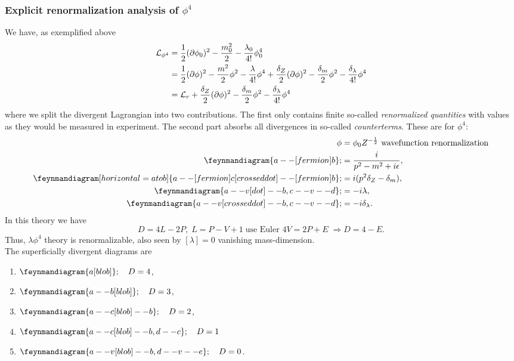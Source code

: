 \subsubsection{Explicit renormalization analysis of $\phi^4$}
\label{subsubsec:phifourrenormalization}
We have, as exemplified above
\begin{align*}
	\mathcal{L}_{\phi^4} &= \frac{1}{2} (\partial \phi_0)^2-\frac{m^2_0}{2} -\frac{\lambda_0}{4!} \phi^4_0 \\
	&= \frac{1}{2} (\partial \phi)^2-\frac{m^2}{2}\phi^2-\frac{\lambda}{4!}\phi^4 + \frac{\delta_Z}{2} (\partial \phi)^2 -\frac{\delta_m}{2} \phi^2 -\frac{\delta_\lambda}{4!} \phi^4\\
	&=\mathcal{L}_r +  \frac{\delta_Z}{2} (\partial \phi)^2 -\frac{\delta_m}{2} \phi^2 -\frac{\delta_\lambda}{4!} \phi^4 
\end{align*}
where we split the divergent Lagrangian into two contributions. The first only contains finite so-called \emph{renormalized quantities} with values as they would be measured in experiment. The second part absorbs all divergences in so-called \emph{counterterms}. These are for $\phi^4$:
\begin{align*}
	\phi &= \phi_0 Z^{-\half} \text{ wavefunction renormalization}\\
	\feynmandiagram{a--[fermion]b}; &= \frac{i}{p^2-m^2+i \epsilon},\\
	\feynmandiagram[horizontal=a to b]{a--[fermion] c [crossed dot] --[fermion] b};&= i (p^2 \delta_Z-\delta_m),\\
	\feynmandiagram{a--v[dot]--b, c--v--d};&=- i \lambda,\\
	\feynmandiagram{a--v[crossed dot] --b, c--v--d}; &=-i \delta_\lambda.
\end{align*}
In this theory we have
\begin{equation}
	D=4L-2P,\; L=P-V+1 \; \text{use Euler } 4 V=2 P+E \; \Rightarrow D=4-E.
\end{equation}
Thus, $\lambda \phi^4$ theory is renormalizable, also seen by $[\lambda]=0$ vanishing mass-dimension.\\
The superficially divergent diagrams are
\begin{enumerate}
	\item $\feynmandiagram{a[blob]};\quad D=4$,
	\item $\feynmandiagram{a--b[blob]}; \quad D=3$,
	\item $\feynmandiagram{a--c[blob]--b};\quad D=2$,
	\item $\feynmandiagram{a--c[blob]--b, d--c}; \quad D=1$
	\item $\feynmandiagram{a--v[blob]--b, d--v--e};\quad D=0$.
\end{enumerate}
